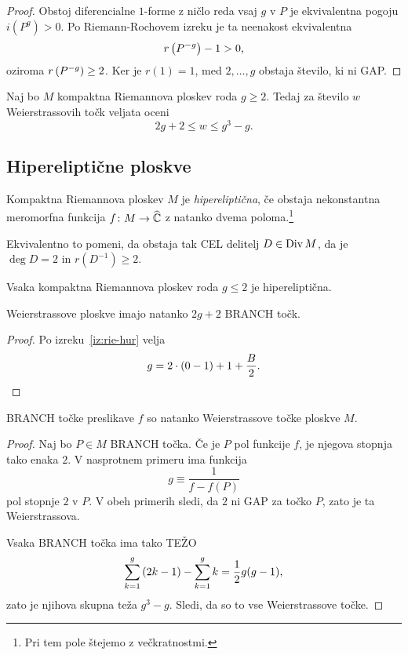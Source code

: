 \begin{proof}
Obstoj diferencialne $1$-forme z ničlo reda vsaj $g$ v $P$ je
ekvivalentna pogoju $i(P^g) > 0$. Po Riemann-Rochovem izreku je ta
neenakost ekvivalentna
\[
r \left(P^{-g}\right) - 1 > 0,
\]
oziroma $r \left(P^{-g}\right) \geq 2$. Ker je $r(1) = 1$, med
$2, \dots, g$ obstaja število, ki ni GAP.
\end{proof}

\begin{lema}
Naj bo $M$ kompaktna Riemannova ploskev roda $g \geq 2$. Tedaj za
število $w$ Weierstrassovih točk veljata oceni
\[
2g + 2 \leq w \leq g^3 - g.
\]
\end{lema}


\subsection{Hipereliptične ploskve}

\begin{definicija}
Kompaktna Riemannova ploskev $M$ je \emph{hipereliptična}, če
obstaja nekonstantna meromorfna funkcija $f \colon M \to \widehat{\mathbb{C}}$ z
natanko dvema poloma.\footnote{Pri tem pole štejemo z
večkratnostmi.}
\end{definicija}

Ekvivalentno to pomeni, da obstaja tak CEL delitelj
$D \in \operatorname{Div} M$, da je $\deg D = 2$ in $r(D^{-1}) \geq 2$.

\begin{trditev}
Vsaka kompaktna Riemannova ploskev roda $g \leq 2$ je
hipereliptična.
\end{trditev}

\begin{trditev}
Weierstrassove ploskve imajo natanko $2g+2$ BRANCH točk.
\end{trditev}

\begin{proof}
Po izreku~\ref{iz:rie-hur} velja
\[
g = 2 \cdot (0-1) + 1 + \frac{B}{2}. \qedhere
\]
\end{proof}

\begin{trditev}
BRANCH točke preslikave $f$ so natanko Weierstrassove točke ploskve
$M$.
\end{trditev}

\begin{proof}
Naj bo $P \in M$ BRANCH točka. Če je $P$ pol funkcije $f$, je
njegova stopnja tako enaka $2$. V nasprotnem primeru ima funkcija
\[
g \equiv \frac{1}{f - f(P)}
\]
pol stopnje $2$ v $P$. V obeh primerih sledi, da $2$ ni GAP za
točko $P$, zato je ta Weierstrassova.

Vsaka BRANCH točka ima tako TEŽO
\[
\sum_{k=1}^g \left(2k-1\right) - \sum_{k=1}^g k = \frac{1}{2} g (g-1),
\]
zato je njihova skupna teža $g^3 - g$. Sledi, da so to vse
Weierstrassove točke.
\end{proof}


